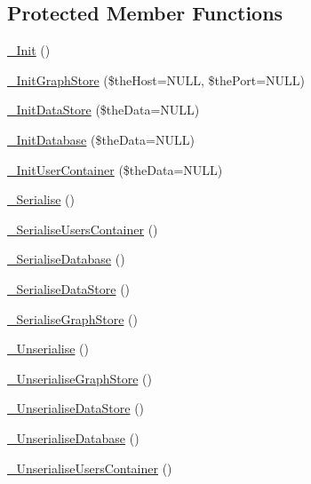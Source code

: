 \subsection*{Protected Member Functions}
\begin{DoxyCompactItemize}
\item 
\hyperlink{class_c_session_mongo_neo4j_ad6a67ce58d8afd527ced541602c4c308}{\-\_\-\-Init} ()
\item 
\hyperlink{class_c_session_mongo_neo4j_a79aed814e8a33ed46c324380a010c4a3}{\-\_\-\-Init\-Graph\-Store} (\$the\-Host=N\-U\-L\-L, \$the\-Port=N\-U\-L\-L)
\item 
\hyperlink{class_c_session_mongo_neo4j_a95bc416f5f17d8fed494a2c38e967e93}{\-\_\-\-Init\-Data\-Store} (\$the\-Data=N\-U\-L\-L)
\item 
\hyperlink{class_c_session_mongo_neo4j_af51da92a11a6f372ca6a13dece46d0b8}{\-\_\-\-Init\-Database} (\$the\-Data=N\-U\-L\-L)
\item 
\hyperlink{class_c_session_mongo_neo4j_aa9cc946456b8366777b667eb376cc03e}{\-\_\-\-Init\-User\-Container} (\$the\-Data=N\-U\-L\-L)
\item 
\hyperlink{class_c_session_mongo_neo4j_abc8c8883c624d8f5012712438cd604a5}{\-\_\-\-Serialise} ()
\item 
\hyperlink{class_c_session_mongo_neo4j_ab787e392987093f1209192218bbd90b8}{\-\_\-\-Serialise\-Users\-Container} ()
\item 
\hyperlink{class_c_session_mongo_neo4j_a6311c1e5d89e5de8188472de659bd50d}{\-\_\-\-Serialise\-Database} ()
\item 
\hyperlink{class_c_session_mongo_neo4j_aac0217b753dc514e86f2d8d85370fad8}{\-\_\-\-Serialise\-Data\-Store} ()
\item 
\hyperlink{class_c_session_mongo_neo4j_a66633d4e2897ad21fd4bb60365a4eb0a}{\-\_\-\-Serialise\-Graph\-Store} ()
\item 
\hyperlink{class_c_session_mongo_neo4j_a0421a188ea69cd104f0a7f4cfa12dd0a}{\-\_\-\-Unserialise} ()
\item 
\hyperlink{class_c_session_mongo_neo4j_a35e3ac82d95c17a6f87ea8edbec8696e}{\-\_\-\-Unserialise\-Graph\-Store} ()
\item 
\hyperlink{class_c_session_mongo_neo4j_a56fa33b41a4cb788a719e1f9d1294e16}{\-\_\-\-Unserialise\-Data\-Store} ()
\item 
\hyperlink{class_c_session_mongo_neo4j_a755c9096c7c3065481d0b4bb4c6e35d2}{\-\_\-\-Unserialise\-Database} ()
\item 
\hyperlink{class_c_session_mongo_neo4j_a74aa7d22079f030cb38686e791ff1ab3}{\-\_\-\-Unserialise\-Users\-Container} ()
\end{DoxyCompactItemize}
